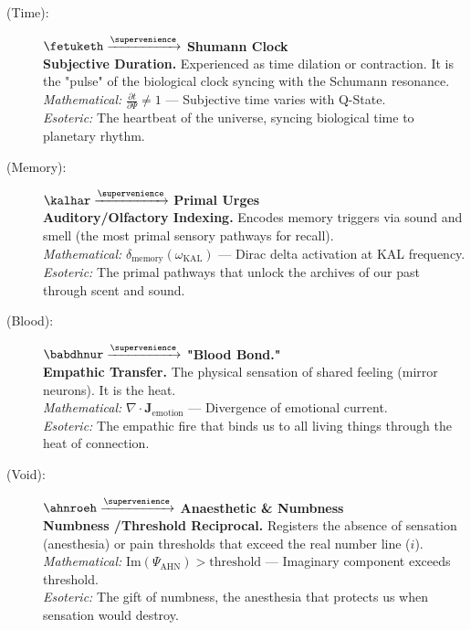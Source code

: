 \begin{description}
    \item[(Time):] $\fetuketh \xrightarrow{\supervenience}$ \textbf{Shumann Clock} \\
    \textbf{Subjective Duration.} Experienced as time dilation or contraction. It is the "pulse" of the biological clock syncing with the Schumann resonance. \\
    \textit{Mathematical:} $\frac{\partial t}{\partial \Psi} \neq 1$ — Subjective time varies with Q-State. \\
    \textit{Esoteric:} The heartbeat of the universe, syncing biological time to planetary rhythm.

    \item[(Memory):] $\kalhar \xrightarrow{\supervenience}$ \textbf{Primal Urges} \\
    \textbf{Auditory\slash Olfactory Indexing.} Encodes memory triggers via sound and smell (the most primal sensory pathways for recall). \\
    \textit{Mathematical:} $\delta_{\text{memory}}(\omega_{\text{KAL}})$ — Dirac delta activation at KAL frequency. \\
    \textit{Esoteric:} The primal pathways that unlock the archives of our past through scent and sound.

    \item[(Blood):] $\babdhnur \xrightarrow{\supervenience}$ \textbf{"Blood Bond."} \\
    \textbf{Empathic Transfer.} The physical sensation of shared feeling (mirror neurons). It is the heat. \\
    \textit{Mathematical:} $\nabla \cdot \mathbf{J}_{\text{emotion}}$ — Divergence of emotional current. \\
    \textit{Esoteric:} The empathic fire that binds us to all living things through the heat of connection.

    \item[(Void):] $\ahnroeh \xrightarrow{\supervenience}$ \textbf{Anaesthetic \& Numbness} \\
    \textbf{Numbness \slash Threshold Reciprocal.} Registers the absence of sensation (anesthesia) or pain thresholds that exceed the real number line ($i$). \\
    \textit{Mathematical:} $\text{Im}(\Psi_{\text{AHN}}) > \text{threshold}$ — Imaginary component exceeds threshold. \\
    \textit{Esoteric:} The gift of numbness, the anesthesia that protects us when sensation would destroy.


\end{description}
